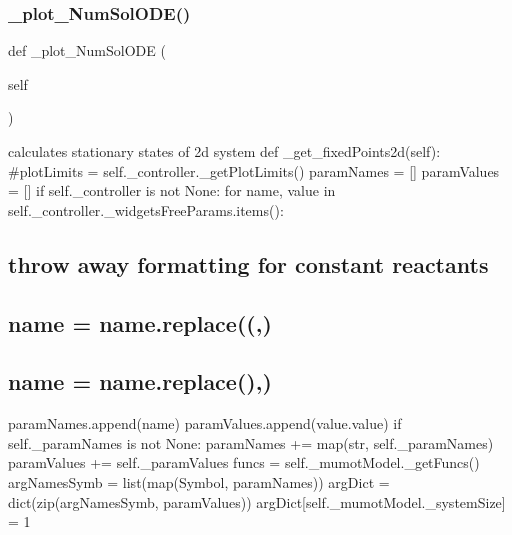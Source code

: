 \mbox{\label{class_mu_mo_t_1_1_mu_mo_t_1_1_mu_mo_ttime_evolution_view_a588142f52d59a2abf3229d40beffbe7e}} 
\subsubsection{\texorpdfstring{\+\_\+plot\+\_\+\+Num\+Sol\+O\+D\+E()}{\_plot\_NumSolODE()}}
{\footnotesize\ttfamily def \+\_\+plot\+\_\+\+Num\+Sol\+O\+DE (\begin{DoxyParamCaption}\item[{}]{self }\end{DoxyParamCaption})\hspace{0.3cm}{\ttfamily [private]}}



calculates stationary states of 2d system def \+\_\+get\+\_\+fixed\+Points2d(self)\+: \#plot\+Limits = self.\+\_\+controller.\+\_\+get\+Plot\+Limits() param\+Names = \mbox{[}\mbox{]} param\+Values = \mbox{[}\mbox{]} if self.\+\_\+controller is not None\+: for name, value in self.\+\_\+controller.\+\_\+widgets\+Free\+Params.\+items()\+: \subsection*{throw away formatting for constant reactants}

\subsection*{name = name.\+replace(\textquotesingle{}(\textquotesingle{},\textquotesingle{}\textquotesingle{})}

\subsection*{name = name.\+replace(\textquotesingle{})\textquotesingle{},\textquotesingle{}\textquotesingle{})}

param\+Names.\+append(name) param\+Values.\+append(value.\+value) if self.\+\_\+param\+Names is not None\+: param\+Names += map(str, self.\+\_\+param\+Names) param\+Values += self.\+\_\+param\+Values funcs = self.\+\_\+mumot\+Model.\+\_\+get\+Funcs() arg\+Names\+Symb = list(map(\+Symbol, param\+Names)) arg\+Dict = dict(zip(arg\+Names\+Symb, param\+Values)) arg\+Dict\mbox{[}self.\+\_\+mumot\+Model.\+\_\+system\+Size\mbox{]} = 1 

